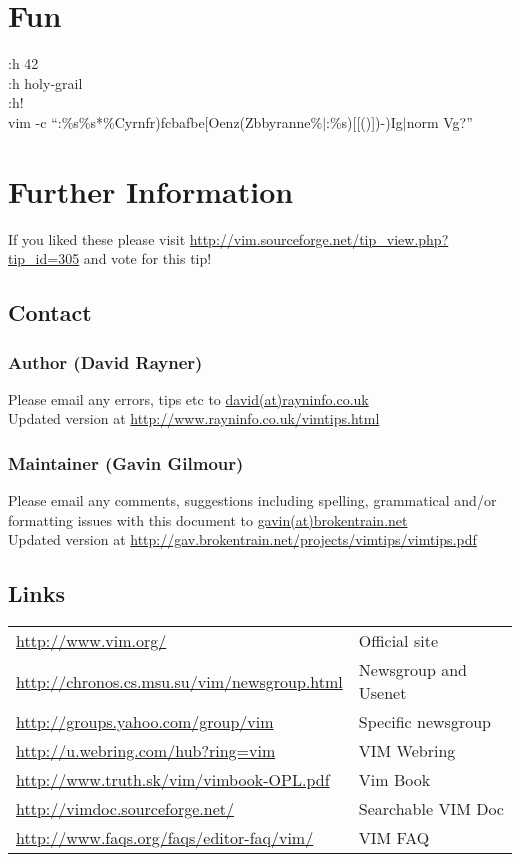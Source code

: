 \documentclass[10pt]{article}
\begin{document}
\section*{Fun}
 :h 42\\
 :h holy-grail\\ 
 :h!\\ 
 vim -c ``:\%s\%s*\%Cyrnfr)fcbafbe[Oenz(Zbbyranne\%$|$:\%s)[[()])-)Ig$|$norm Vg?''

\section*{Further Information}
If you liked these please visit \url{http://vim.sourceforge.net/tip_view.php?tip_id=305} and vote for this tip!
 
\subsection*{Contact}

\subsubsection*{Author (David Rayner)}
Please email any errors, tips etc to \url{david(at)rayninfo.co.uk}\\ 
Updated version at \url{http://www.rayninfo.co.uk/vimtips.html}

\subsubsection*{Maintainer (Gavin Gilmour)}
Please email any comments, suggestions including spelling, grammatical and/or formatting issues with this document to \url{gavin(at)brokentrain.net}\\
Updated version at \url{http://gav.brokentrain.net/projects/vimtips/vimtips.pdf}

\subsection*{Links}
\begin{longtable}{l|l}
    \url{http://www.vim.org/} & Official site\\
    \url{http://chronos.cs.msu.su/vim/newsgroup.html} & Newsgroup and Usenet\\
    \url{http://groups.yahoo.com/group/vim} & Specific newsgroup\\ 
    \url{http://u.webring.com/hub?ring=vim} & VIM Webring\\ 
    \url{http://www.truth.sk/vim/vimbook-OPL.pdf} & Vim Book\\ 
    \url{http://vimdoc.sourceforge.net/} & Searchable VIM Doc\\ 
    \url{http://www.faqs.org/faqs/editor-faq/vim/} & VIM FAQ\\ 
\end{longtable}
\end{document}
